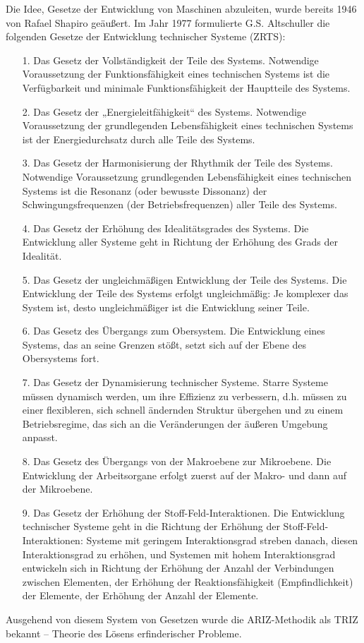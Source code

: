 \documentclass[11pt,a4paper]{article}
\begin{document}
Die Idee, Gesetze der Entwicklung von Maschinen abzuleiten, wurde bereits 1946
von Rafael Shapiro geäußert. Im Jahr 1977 formulierte G.S. Altschuller die
folgenden Gesetze der Entwicklung technischer Systeme (ZRTS):
\begin{itemize}
\item[1.] Das Gesetz der Vollständigkeit der Teile des Systems. Notwendige
  Voraussetzung der Funktionsfähigkeit eines technischen Systems ist die
  Verfügbarkeit und minimale Funktionsfähigkeit der Hauptteile des Systems.
\item[2.] Das Gesetz der „Energieleitfähigkeit“ des Systems. Notwendige
  Voraussetzung der grundlegenden Lebensfähigkeit eines technischen Systems
  ist der Energiedurchsatz durch alle Teile des Systems.
\item[3.] Das Gesetz der Harmonisierung der Rhythmik der Teile des Systems.
  Notwendige Voraussetzung grundlegenden Lebensfähigkeit eines technischen
  Systems ist die Resonanz (oder bewusste Dissonanz) der Schwingungsfrequenzen
  (der Betriebsfrequenzen) aller Teile des Systems.
\item[4.] Das Gesetz der Erhöhung des Idealitätsgrades des Systems. Die
  Entwicklung aller Systeme geht in Richtung der Erhöhung des Grads der
  Idealität.
\item[5.] Das Gesetz der ungleichmäßigen Entwicklung der Teile des Systems.
  Die Entwicklung der Teile des Systems erfolgt ungleichmäßig: Je komplexer
  das System ist, desto ungleichmäßiger ist die Entwicklung seiner Teile.
\item[6.] Das Gesetz des Übergangs zum Obersystem. Die Entwicklung eines
  Systems, das an seine Grenzen stößt, setzt sich auf der Ebene des
  Obersystems fort.
\item[7.] Das Gesetz der Dynamisierung technischer Systeme. Starre Systeme
  müssen dynamisch werden, um ihre Effizienz zu verbessern, d.h. müssen zu
  einer flexibleren, sich schnell ändernden Struktur übergehen und zu einem
  Betriebsregime, das sich an die Veränderungen der äußeren Umgebung anpasst.
\item[8.] Das Gesetz des Übergangs von der Makroebene zur Mikroebene. Die
  Entwicklung der Arbeitsorgane erfolgt zuerst auf der Makro- und dann auf der
  Mikroebene.
\item[9.] Das Gesetz der Erhöhung der Stoff-Feld-Interaktionen. Die
  Entwicklung technischer Systeme geht in die Richtung der Erhöhung der
  Stoff-Feld-Interaktionen: Systeme mit geringem Interaktionsgrad streben
  danach, diesen Interaktionsgrad zu erhöhen, und Systemen mit hohem
  Interaktionsgrad entwickeln sich in Richtung der Erhöhung der Anzahl der
  Verbindungen zwischen Elementen, der Erhöhung der Reaktionsfähigkeit
  (Empfindlichkeit) der Elemente, der Erhöhung der Anzahl der Elemente.
\end{itemize}
Ausgehend von diesem System von Gesetzen wurde die ARIZ-Methodik als TRIZ
bekannt -- Theorie des Lösens erfinderischer Probleme.
\end{document}
